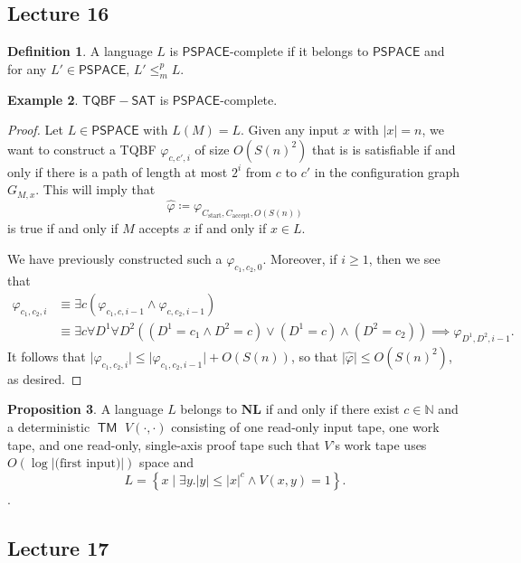 \documentclass[10pt,letterpaper,cm]{nupset}
\theoremstyle{definition}
\newtheorem{definition}{Definition}[subsection]
\newtheorem{exmp}[definition]{Example}
\theoremstyle{theorem}
\newtheorem{prop}[definition]{Proposition}
\theoremstyle{remark}
\newcommand{\N}{\mathbb N}
\newcommand{\1}{\mathbf{1}}
\newcommand{\0}{\vec 0}
\DeclareMathOperator{\TM}{\mathsf{TM}}
\begin{document}
\subsection{Lecture 16}

\begin{definition}
A language $L$ is $\mathsf{PSPACE}$-complete if it belongs to $\mathsf{PSPACE}$ and for any $L' \in \mathsf{PSPACE}$, $L' \leq_m^p L$.
\end{definition}

\begin{exmp}
$\mathsf{TQBF{-}SAT} $ is $\mathsf{PSPACE}$-complete.
\end{exmp}
\begin{proof}
Let $L \in \mathsf{PSPACE}$ with $L(M) = L$. Given any input $x$ with $\lvert{x}\rvert =n$, we want to construct a TQBF $\varphi_{c, c', i}$ of size $O(S(n)^2)$ that is is satisfiable if and only if there is a path of length at most $2^i$ from $c$ to $c'$ in the configuration graph $G_{M,x}$. This will imply that $$\hat{\varphi}\coloneqq \varphi_{C_{\text{start}}, C_{\text{accept}}, O(S(n))}$$ is true if and only if $M$ accepts $x$ if and only if $x\in L$.


 We have previously constructed such a $\varphi_{c_1, c_2, 0}$. Moreover, if $i\geq 1$, then we see that 
\begin{align*}
\varphi_{c_1, c_2, i} & \equiv \exists c(\varphi_{c_1, c, i-1} \land \varphi_{c, c_2, i-1})
\\ & \equiv \exists c \forall D^1 \forall D^2((D^1 = c_1 \land D^2 = c) \vee (D^1 = c) \land (D^2 = c_2)) \implies \varphi_{D^1, D^2, i-1}.
\end{align*}
It follows that $\lvert{\varphi_{c_1, c_2, i}}\rvert\leq \lvert{\varphi_{c_1, c_2, i-1}}\rvert +O(S(n))$, so that $\lvert{\hat{\varphi}}\rvert \leq O(S(n)^2)$, as desired.
\end{proof}

\begin{prop}
A language $L$ belongs to $\mathbf{NL}$ if and only if there exist $c\in \N$ and a deterministic $\TM$ $V(\cdot, \cdot)$ consisting of one read-only input tape, one work tape, and one read-only, single-axis proof tape  such that $V$'s work tape uses $O(\log{|\text{(first input)}|})$ space and $$L = \left\{ x \mid \exists y.\lvert{y}\rvert \leq \lvert{x}\rvert^{c} \land V(x,y) = 1\right\}.$$ .
\end{prop}

\subsection{Lecture 17}
\end{document}
